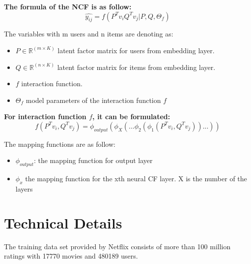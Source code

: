 \documentclass[final]{cvpr}
\newcommand{\R}{\mathbb{R}}
\begin{document}
\bigskip
\textbf{ The formula of the NCF is as follow:}
$$\hat{y_{ij}} = f(P^T v_i Q^T v_j|P,Q,\Theta_f)$$

The variables with m users and n items are denoting as:
\begin{itemize}
    \item $P \in \R^{(m \times K)}$ latent factor matrix for users from embedding layer.
    \item $Q \in \R ^{(n \times K)}$ latent factor matrix for items from embedding layer.
    \item $f$ interaction function.    
    \item $\Theta_{f}$ model parameters of the interaction function $f$
\end{itemize}

\bigskip
\textbf{ For interaction function $f$, it can be formulated:}
$$f(P^T v_i, Q^T v_j) = \phi_{output}(\phi_X(...\phi_2(\phi_1(P^T v_i, Q^T v_j))...))$$

The mapping functions are as follow:
\begin{itemize}
    \item $\phi_{output}$: the mapping function for output layer
    \item $\phi_x$ the mapping function for the xth neural CF layer. X is the number of the layers
\end{itemize}



\section{Technical Details}
The training data set provided by Netflix consists of more than 100 million ratings with 17770 movies and 480189 users.
\end{document}

